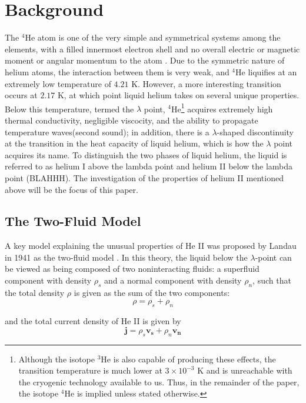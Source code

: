 
\section{Background}\label{background}

The $^4$He atom is one of the very simple and symmetrical systems
among the elements, with a filled innermost electron shell and no
overall electric or magnetic moment or angular momentum to the atom
\cite{atkins}. Due to the symmetric nature of helium atoms, the
interaction between them is very weak, and $^4$He liquifies at an
extremely low temperature of $4.21$ K. However, a more interesting
transition occurs at $2.17$ K, at which point liquid helium takes on
several unique properties. Below this temperature, termed the
$\lambda$ point, $^4$He\footnote{Although the isotope $^3$He is also
  capable of producing these effects, the transition temperature is
  much lower at $3\times 10^{-3}$ K and is unreachable with the
  cryogenic technology available to us. Thus, in the remainder of the
  paper, the isotope $^4$He is implied unless stated otherwise.}
acquires extremely high thermal conductivity, negligible viscocity,
and the ability to propagate temperature waves(second sound); in
addition, there is a $\lambda$-shaped discontinuity at the transition
in the heat capacity of liquid helium, which is how the $\lambda$
point acquires its name. To distinguish the two phases of liquid
helium, the liquid is referred to as helium I above the lambda point
and helium II below the lambda point (BLAHHH). The investigation of
the properties of helium II mentioned above will be the focus of this
paper.

\subsection{The Two-Fluid Model}

A key model explaining the unusual properties of He II was proposed by
Landau in 1941 as the two-fluid model \cite{landau}. In this theory,
the liquid below the $\lambda$-point can be viewed as being composed
of two noninteracting fluids: a superfluid component with density
$\rho_s$ and a normal component with density $\rho_n$, such that the
total density $\rho$ is given as the sum of the two components:
\begin{equation}
\rho = \rho_s + \rho_n
\end{equation}

and the total current density of He II is given by
\begin{equation}
\mathbf{j} = \rho_s\mathbf{v_s} + \rho_n\mathbf{v_n}
\end{equation}

